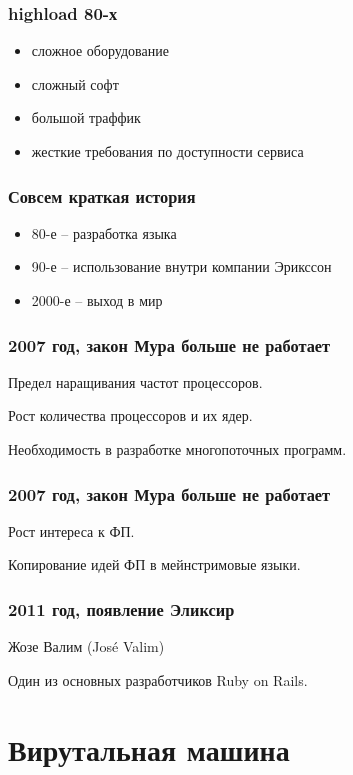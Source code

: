 \documentclass[10pt]{beamer}
\begin{document}
\begin{frame}
\frametitle{highload 80-х}
\begin{itemize}
\item сложное оборудование
\item сложный софт
\item большой траффик
\item жесткие требования по доступности сервиса
\end{itemize}
\end{frame}

\begin{frame}
\frametitle{Совсем краткая история}
\begin{itemize}
\item 80-е -- разработка языка
\item 90-е -- использование внутри компании Эрикссон
\item 2000-е -- выход в мир
\end{itemize}
\end{frame}

\begin{frame}
\frametitle{2007 год, закон Мура больше не работает}
\centering
Предел наращивания частот процессоров.
\par \bigskip
Рост количества процессоров и их ядер.
\par \bigskip
Необходимость в разработке многопоточных программ.
\end{frame}

\begin{frame}
\frametitle{2007 год, закон Мура больше не работает}
\centering
Рост интереса к ФП.
\par \bigskip
Копирование идей ФП в мейнстримовые языки.
\end{frame}

\begin{frame}
\frametitle{2011 год, появление Эликсир}
\centering
Жозе Валим (José Valim)
\par \bigskip
Один из основных разработчиков Ruby on Rails.
\end{frame}

\iffalse

\section{Вирутальная машина}

\begin{frame}
\frametitle{}
\centering
\par \bigskip
\end{frame}
\end{document}
